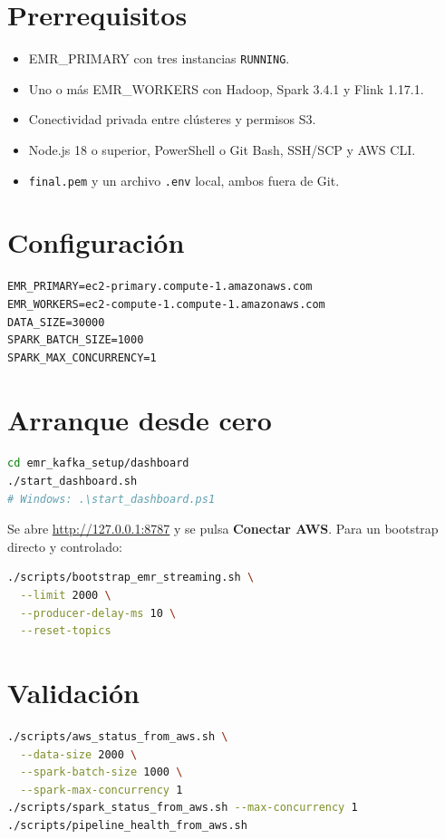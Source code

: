 \documentclass[11pt,a4paper,openany]{report}
\newcommand{\topic}[1]{\texttt{#1}}
\begin{document}
\section{Prerrequisitos}

\begin{itemize}
  \item EMR\_PRIMARY con tres instancias \topic{RUNNING}.
  \item Uno o más EMR\_WORKERS con Hadoop, Spark 3.4.1 y Flink 1.17.1.
  \item Conectividad privada entre clústeres y permisos S3.
  \item Node.js 18 o superior, PowerShell o Git Bash, SSH/SCP y AWS CLI.
  \item \topic{final.pem} y un archivo \topic{.env} local, ambos fuera de Git.
\end{itemize}

\section{Configuración}

\begin{lstlisting}
EMR_PRIMARY=ec2-primary.compute-1.amazonaws.com
EMR_WORKERS=ec2-compute-1.compute-1.amazonaws.com
DATA_SIZE=30000
SPARK_BATCH_SIZE=1000
SPARK_MAX_CONCURRENCY=1
\end{lstlisting}

\section{Arranque desde cero}

\begin{lstlisting}[language=bash]
cd emr_kafka_setup/dashboard
./start_dashboard.sh
# Windows: .\start_dashboard.ps1
\end{lstlisting}

Se abre \url{http://127.0.0.1:8787} y se pulsa \textbf{Conectar AWS}. Para un bootstrap directo y controlado:

\begin{lstlisting}[language=bash]
./scripts/bootstrap_emr_streaming.sh \
  --limit 2000 \
  --producer-delay-ms 10 \
  --reset-topics
\end{lstlisting}

\section{Validación}

\begin{lstlisting}[language=bash]
./scripts/aws_status_from_aws.sh \
  --data-size 2000 \
  --spark-batch-size 1000 \
  --spark-max-concurrency 1
./scripts/spark_status_from_aws.sh --max-concurrency 1
./scripts/pipeline_health_from_aws.sh
\end{lstlisting}
\end{document}
